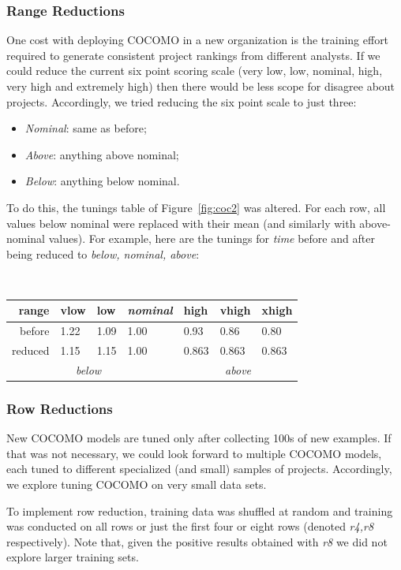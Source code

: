 \documentclass{sig-alternate}
\newcommand{\bi}{\begin{itemize}[leftmargin=0.4cm]}
\newcommand{\ei}{\end{itemize}}
\newcommand{\fig}[1]{Figure~\ref{fig:#1}}
\begin{document}
\subsubsection{Range Reductions}
One cost with deploying COCOMO in a new
organization is the training effort required to generate consistent project
rankings from different analysts. If we could reduce 
the current six
point scoring scale (very low, low, nominal, high, very high and extremely high)
then there would be less scope 
for disagree about projects. 
Accordingly,  we tried
reducing the  six point scale to just three:
\bi
\item {\em Nominal}: same as before;
\item {\em Above}: anything above nominal;
\item {\em Below}: anything below nominal.
\ei
To do  this, the tunings table of
\fig{coc2} was altered. For each row, all values
below nominal were replaced with their mean (and
similarly with above-nominal values).  For example,
here are the tunings for {\em time} before and after
being reduced to {\em below, nominal, above}:

{\scriptsize   
~~~~~~\begin{tabular}{r|ll|l|lll|}
      range      & vlow&  low&{\em nominal}&high&vhigh&xhigh\\\hline
     before & 1.22& 1.09& 1.00& 0.93& 0.86& 0.80\\
     reduced&1.15& 1.15& 1.00&  0.863& 0.863&0.863\\\cline{2-3}\cline{5-7}
                 & \multicolumn{2}{c|}{{\em below}} &&\multicolumn{3}{c|}{{\em above}}
\end{tabular}
 }
\subsubsection{Row Reductions}\label{sect:row}
New COCOMO models are tuned only after collecting
100s of new examples. If that was not necessary, we could look forward to multiple
COCOMO models, each tuned to different specialized (and small) samples of projects.
Accordingly, we explore tuning COCOMO
on very small data sets.

To implement  row reduction, training data was
shuffled at random and training was conducted on
all rows or  just the first four or eight  rows
(denoted {\em r4,r8} respectively). Note that, given  the positive
results obtained with {\em r8} we did not explore larger training sets.
\end{document}
